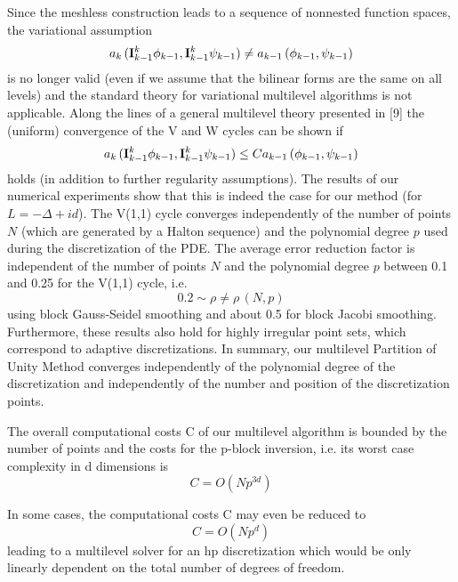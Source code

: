 \documentclass[11pt]{article}
\begin{document}
Since the meshless construction leads to a sequence of nonnested
function spaces, the variational assumption
$$
a_k\,({\bf I}_{k-1}^k \phi_{k-1}, {\bf I}_{k-1}^k \psi_{k-1}) \not= a_{k - 1}\,(\phi_{k-1}, \psi_{k-1})
$$
is no longer valid (even if we assume that the bilinear forms
are the same on all levels)
and the standard theory for variational multilevel algorithms
is not applicable. Along the lines of a general multilevel
theory presented in [9]
the (uniform) convergence of the V and W cycles can be shown if
$$
a_k\,({\bf I}_{k-1}^k \phi_{k-1}, {\bf I}_{k-1}^k \psi_{k-1}) \leq C a_{k - 1}\,(\phi_{k-1}, \psi_{k-1})
$$
holds (in addition to further regularity assumptions).
The results of our numerical experiments show that this is indeed
the case for our method (for $L = -\Delta + id$).
The V(1,1) cycle converges independently of the number of points
$N$
(which are generated by a Halton sequence) and the polynomial
degree $p$ used during the discretization of the PDE.
The average error reduction factor is independent
of the number of points $N$ and the polynomial degree $p$
between 0.1 and 0.25 for the V(1,1) cycle, i.e.
$$
0.2 \sim \rho \not= \rho\,(N, p)
$$
using block Gauss-Seidel smoothing and about 0.5 for block Jacobi smoothing.
Furthermore, these results also hold for highly irregular
point sets, which correspond to adaptive discretizations.
In summary, our multilevel Partition of Unity Method
converges independently of the polynomial degree
of the discretization and independently of the
number and position of the discretization points.

The overall computational costs C of our multilevel algorithm
is bounded by the number of points and the costs for the
p-block inversion, i.e. its worst case complexity in d dimensions is
$$
C = O(Np^{3d})
$$

In some cases, the computational costs C may even be reduced to
$$
C = O(Np^{d})
$$
leading to a multilevel solver for an hp discretization which would be
only linearly dependent on the total number of degrees of freedom.
\end{document}
